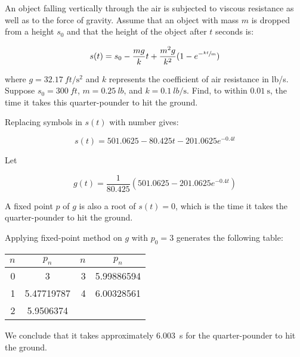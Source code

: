 \documentclass[../../../../Assignments]{subfiles}
\begin{document}
\begin{exercise}
    An object falling vertically through the air is subjected to viscous
    resistance as well as to the force of gravity. Assume that an object with
    mass \(m\) is dropped from a height \(s_0\) and that the height of the
    object after \(t\) seconds is:

    \[s(t) = s_0 - \frac{mg}{k} t + \frac{m^2g}{k^2} (1 - e^{- \sfrac{kt}{m}})\]

    \noindent where \(g = \SI{32.17}{ft \per \second \squared}\) and \(k\)
    represents the coefficient of air resistance in lb/s. Suppose \(s_0 =
    \SI{300}{ft}\), \(m = \SI{0.25}{lb}\), and \(k = \SI{0.1}{lb \per
    \second}\). Find, to within \(\SI{0.01}{\second}\), the time it takes this
    quarter-pounder to hit the ground.
\end{exercise}

\begin{solution}
    Replacing symbols in \(s(t)\) with number gives:

    \[s(t) = \num{501.0625} - \num{80.425} t - \num{201.0625} e^{\num{-0.4} t}\]

    Let

    \[g(t) = \frac{1}{80.425} (501.0625 - \num{201.0625} e^{\num{-0.4} t})\]

    A fixed point \(p\) of \(g\) is also a root of \(s(t) = 0\), which is the
    time it takes the quarter-pounder to hit the ground.

    Applying fixed-point method on \(g\) with \(p_0 = 3\) generates the
    following table:

    \begin{table}[H]
        \centering
        \begin{tabular}{r S[table-format=1.8] r S[table-format=1.8]}
            \toprule
            \(n\)  &   {\(p_n\)}   &  \(n\)  &   {\(p_n\)}   \\
              &  3            &      3  &  5.99886594   \\
                1  &  5.47719787   &      4  &  6.00328561   \\
                2  &  5.9506374    &         &               \\
            \bottomrule
        \end{tabular}
    \end{table}

    We conclude that it takes approximately \SI{6.003}{\second} for the
    quarter-pounder to hit the ground.
\end{solution}
\end{document}
